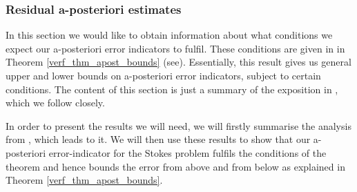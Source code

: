 \documentclass[12pt,a4paper]{article}
\theoremstyle{definition}
\begin{document}
\subsubsection{Residual a-posteriori estimates}
In this section we would like to obtain information about what conditions we expect our a-posteriori error indicators to fulfil.  These conditions are given in in Theorem \ref{verf_thm_apost_bounds} (see\cite[Theorem 4.7]{verfurth2013posteriori}).  Essentially, this result gives us general upper and lower bounds on a-posteriori error indicators, subject to certain conditions.  The content of this section is just a summary of the exposition in  \cite[\S 4.1.4]{verfurth2013posteriori}, which we follow closely.  

In order to present the results we will need, we will firstly summarise the analysis from \cite{verfurth2013posteriori}, which leads to it.  We will then use these results to show that our a-posteriori error-indicator for the Stokes problem fulfils the conditions of the theorem and hence bounds the error from above and from below as explained in Theorem \ref{verf_thm_apost_bounds}.  
\end{document}

